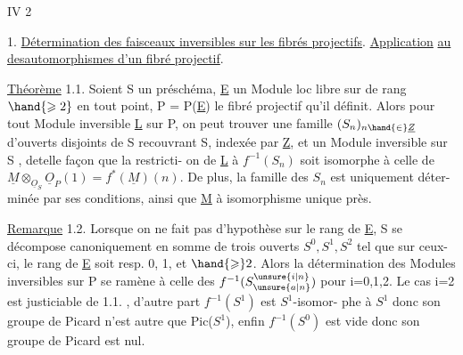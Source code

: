 
IV 2 

1. \uline{Détermination des faisceaux inversibles sur les fibrés projectifs}.
\uline{Application} \uline{au  des}\hand{/}\uline{automorphismes d'un fibré projectif}.

\uline{Théorème} 1.1. Soient S un préschéma, \underline{E} un Module loc libre sur  de
rang  $\hand{\geqslant 2}$ en tout point,
 P = P(\underline{E}) le fibré projectif qu'il définit. Alors
\margin{\unsure{*|+}} pour tout Module inversible \underline{L} sur P, on peut trouver une famille
 $(S_n)_{n\hand{\in}\underline{Z}}$ d'ouverts disjoints de S recouvrant S, indexée par \underline{Z}, et
 un Module inversible  sur S , detelle façon que
 la restricti-%
on de \underline{L} à $f^{-1}(S_n)$ soit isomorphe à celle de $\underline{M}\otimes_{\underline{O}_S}\underline{O}_P(1) = f^*(\underline{M})(n)$.
De plus, la  famille des $S_n$  est uniquement déter-%
minée par ses conditions, ainsi que \underline{M} à isomorphisme unique près.

\uline{Remarque} 1.2. Lorsque on ne fait pas d'hypothèse sur le rang de \underline{E}, S se
décompose canoniquement en somme de trois ouverts $S^0,S^1,S^2$ tel que sur
ceux-ci, le rang de \underline{E} soit resp. 0, 1, et $\hand{\geqslant} 2$. Alors la détermination des
Modules inversibles sur P se ramène à celle des $f^{-1}(S^{\unsure{i|n}}_{\unsure{a|n}})$ pour i=0,1,2.
Le cas i=2 est justiciable de 1.1. , d'autre part $f^{-1}(S^1)$ est $S^1$-isomor-%
phe à $S^1$ donc son groupe de Picard n'est autre que Pic($S^1$), enfin
$f^{-1}(S^0)$ est vide donc son groupe de Picard est nul.

